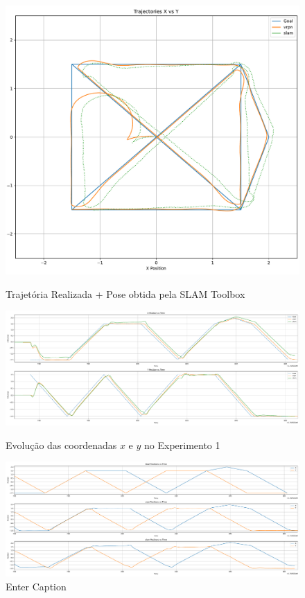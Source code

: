 \begin{figure}[htb]
    \centering
    \caption{Trajetória Realizada + Pose obtida pela SLAM Toolbox}
    \includegraphics[width=0.8\linewidth]{img/Resultados/Exp1_VRPN_Control_LINEAR/Trajetoria_ALL.pdf}
    \label{fig:Exp1_Trajetoria_All}
\end{figure}

\begin{figure}[htb]
    \centering
    \caption{Evolução das coordenadas $x$ e $y$ no Experimento 1}
    \includegraphics[width=\linewidth]{img/Resultados/Exp1_VRPN_Control_LINEAR/Position_v_time.pdf}
    \sourceParbox[\linewidth]
    \label{fig:Exp1_XY_vs_tempo}
\end{figure}

\begin{figure}
    \centering
    \includegraphics[width=1\linewidth]{img/Resultados/Exp1_VRPN_Control_LINEAR/Posicoes_v_tempo.pdf}
    \caption{Enter Caption}
    \label{fig:enter-label}
\end{figure}


